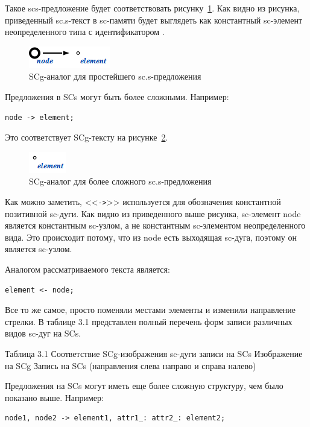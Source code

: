 Такое scs-предложение будет соответствовать
рисунку~\ref{fig:SCs_simple_sentence}. Как видно из рисунка,
приведенный sc.s-текст в sc-памяти будет выглядеть как константный
sc-элемент неопределенного типа с идентификатором .

\begin{figure}[h!]
  \centering
  \includegraphics{images/5/scs/simple_sentence}
  \caption{SCg-аналог для простейшего sc.s-предложения}
  \label{fig:SCs_simple_sentence}
\end{figure}

Предложения в SCs могут быть более сложными. Например:
\begin{verbatim}
node -> element;
\end{verbatim}

Это соответствует SCg-тексту на рисунке~\ref{fig:SCs_sentence}.

\begin{figure}[h!]
  \centering
  \includegraphics{images/5/scs/sentence}
  \caption{SCg-аналог для более сложного sc.s-предложения}
  \label{fig:SCs_sentence}
\end{figure}

Как можно заметить, <<\texttt{->}>> используется для обозначения
константной позитивной sc-дуги. Как видно из приведенного выше
рисунка, sc-элемент node является константным sc-узлом, а не
константным sc-элементом неопределенного вида. Это происходит потому,
что из node есть выходящая sc-дуга, поэтому он является sc-узлом.

Аналогом рассматриваемого текста является:
\begin{verbatim}
element <- node;
\end{verbatim}

Все то же самое, просто поменяли местами элементы и изменили
направление стрелки. В таблице 3.1 представлен полный перечень форм
записи различных видов sc-дуг на SCs.

Таблица 3.1 Соответствие SCg-изображения sc-дуги записи на SCs
Изображение на SCg	Запись на SCs (направления слева направо и справа налево)


Предложения на SCs могут иметь еще более сложную структуру, чем было
показано выше. Например:
\begin{verbatim}
node1, node2 -> element1, attr1_: attr2_: element2;
\end{verbatim}

